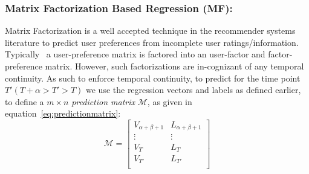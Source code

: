 \subsubsection{\label{sec:model:matrixfactor} Matrix Factorization Based Regression (MF):}
Matrix Factorization is a well accepted technique in
the recommender systems literature to predict user 
preferences from incomplete user ratings/information. Typically~\cite{canny2002factor}
a user-preference matrix is factored into an user-factor and
factor-preference matrix. However, such factorizations are in-cognizant of any 
temporal continuity. As such to enforce temporal continuity, to predict for the time point 
$T' (T +\alpha > T' > T)$ we use the regression vectors 
and labels as defined earlier, %
to define a $m \times n$ {\it prediction
matrix} $\mathcal{M}$, as given in equation~\ref{eq:predictionmatrix}:
\vspace{-1em}
\begin{equation}
  \label{eq:predictionmatrix}
\mathcal{M} = \left[\begin{array}{ll}
              V_{\alpha + \beta + 1} & L_{\alpha+\beta + 1} \\
                              \vdots & \vdots \\
                               V_{T} & L_T \\
                               V_{T'} & L_{T'} \\ 
    \end{array}
  \right]
\end{equation}

